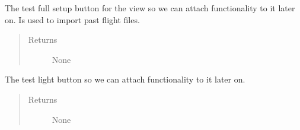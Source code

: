 \documentclass[letterpaper,10pt,english]{sphinxmanual}
\begin{document}
\begin{fulllineitems}
\begin{fulllineitems}
\begin{quote}
\begin{description}
\end{description}\end{quote}

\end{fulllineitems}


\begin{fulllineitems}
\label{\detokenize{index:src.Views.View_VerifySetupScreen.VerifySetupWindow.set_BtnTestFull}}
The test full setup button for the view so we can attach functionality to it later on.
Is used to import past flight files.
\begin{quote}\begin{description}
\item[{Returns}] \leavevmode
None

\end{description}\end{quote}

\end{fulllineitems}


\begin{fulllineitems}
\label{\detokenize{index:src.Views.View_VerifySetupScreen.VerifySetupWindow.set_BtnTestLight}}
The test light button so we can attach functionality to it later on.
\begin{quote}\begin{description}
\item[{Returns}] \leavevmode
None

\end{description}\end{quote}

\end{fulllineitems}



\end{fulllineitems}
\end{document}
